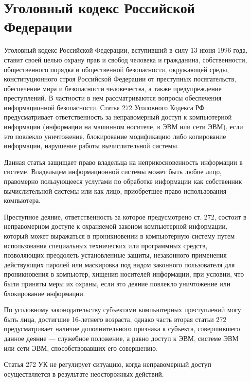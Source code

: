 \section{Уголовный кодекс Российской Федерации} \label{rights_uk}

Уголовный кодекс Российской Федерации, вступивший в силу 13 июня 1996 года, ставит своей целью охрану прав и свобод человека и гражданина, собственности, общественного порядка и общественной безопасности, окружающей среды, конституционного строя Российской Федерации от преступных посягательств, обеспечение мира и безопасности человечества, а также предупреждение преступлений. В частности в нем рассматриваются вопросы обеспечения информационной безопасности. Статья 272 Уголовного Кодекса РФ предусматривает ответственность за неправомерный доступ к компьютерной информации (информации на машинном носителе, в ЭВМ или сети ЭВМ), если это повлекло уничтожение, блокирование модификацию либо копирование информации, нарушение работы вычислительной системы.

\vspace{\baselineskip}
Данная статья защищает право владельца на неприкосновенность информации в системе. Владельцем информационной системы может быть любое лицо, правомерно пользующееся услугами по обработке информации как собственник вычислительной системы или как лицо, приобретшее право использования компьютера.

\vspace{\baselineskip}
Преступное деяние, ответственность за которое предусмотрено ст. 272, состоит в неправомерном доступе к охраняемой законом компьютерной информации, который может выражаться в проникновении в компьютерную систему путем использования специальных технических или программных средств, позволяющих преодолеть установленные защиты, незаконного применения действующих паролей или маскировка под видом законного пользователя для проникновения в компьютер, хищения носителей информации, при условии, что были приняты меры их охраны, если это деяние повлекло уничтожение или блокирование информации.

\vspace{\baselineskip}
По уголовному законодательству субъектами компьютерных преступлений могу быть лица, достигшие 16-летнего возраста, однако часть вторая статьи 272 предусматривает наличие дополнительного признака к субъекта, совершившего данное деяние --- служебное положение, а равно доступ к ЭВМ, системе ЭВМ или сети ЭВМ, способствовавших его совершению.

\vspace{\baselineskip}
Статья 272 УК не регулирует ситуацию, когда неправомерный доступ осуществляется в результате неосторожных действий.
